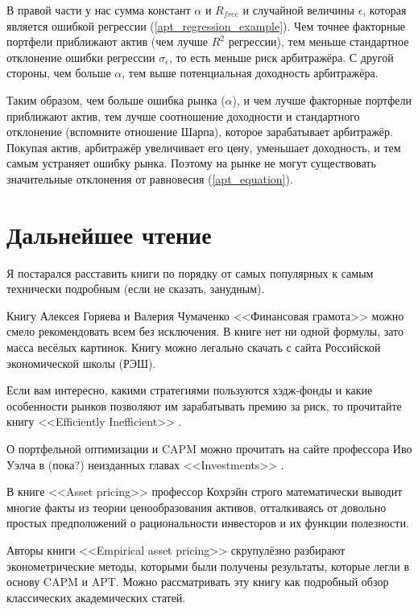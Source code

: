 В правой части у нас сумма констант $\alpha$ и $R_{free}$ и случайной величины $\epsilon$, которая является ошибкой регрессии (\ref{apt_regression_example}). Чем точнее факторные портфели приближают актив (чем лучше $R^2$ регрессии), тем меньше стандартное отклонение ошибки регрессии $\sigma_{\epsilon}$, то есть меньше риск арбитражёра. С другой стороны, чем больше $\alpha$, тем выше потенциальная доходность арбитражёра.

Таким образом, чем больше ошибка рынка ($\alpha$), и чем лучше факторные портфели приближают актив, тем лучше соотношение доходности и стандартного отклонение (вспомните отношение Шарпа), которое зарабатывает арбитражёр. Покупая актив, арбитражёр увеличивает его цену, уменьшает доходность, и тем самым устраняет ошибку рынка. Поэтому на рынке не могут существовать значительные отклонения от равновесия (\ref{apt_equation}).

\section*{Дальнейшее чтение}

Я постарался расставить книги по порядку от самых популярных к самым технически подробным (если не сказать, занудным).

Книгу Алексея Горяева и Валерия Чумаченко <<Финансовая грамота>> \cite{goryaev2009} можно смело рекомендовать всем без исключения. В книге нет ни одной формулы, зато масса весёлых картинок. Книгу можно легально скачать с сайта Российской экономической школы (РЭШ).

Если вам интересно, какими стратегиями пользуются хэдж-фонды и какие особенности рынков позволяют им зарабатывать премию за риск, то прочитайте книгу <<Efficiently Inefficient>> \cite{pedersen2015efficiently}.

О портфельной оптимизации и CAPM можно прочитать на сайте профессора Иво Уэлча в (пока?) неизданных главах <<Investments>> \cite{welch}.

В книге <<Asset pricing>> \cite{cochrane2005asset} профессор Кохрэйн строго математически выводит многие факты из теории ценообразования активов, отталкиваясь от довольно простых предположений о рациональности инвесторов и их функции полезности.

Авторы книги <<Empirical asset pricing>> \cite{bali2016empirical} скрупулёзно разбирают эконометрические методы, которыми были получены результаты, которые легли в основу CAPM и APT. Можно рассматривать эту книгу как подробный обзор классических академических статей.

